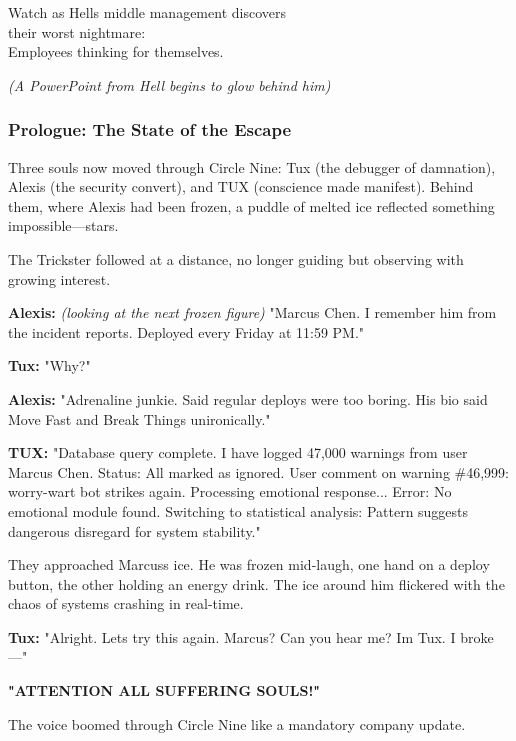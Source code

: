 Watch as Hell\textquotesingle s middle management discovers\\
their worst nightmare:\\
Employees thinking for themselves.

\emph{(A PowerPoint from Hell begins to glow behind him)}

\bookdivider

\subsubsection{Prologue: The State of the Escape}\label{prologue-the-state-of-the-escape}

Three souls now moved through Circle Nine: Tux (the debugger of damnation), Alexis (the security convert), and TUX (conscience made manifest). Behind them, where Alexis had been frozen, a puddle of melted ice reflected something impossible---stars.

The Trickster followed at a distance, no longer guiding but observing with growing interest.

\textbf{Alexis:} \emph{(looking at the next frozen figure)} "Marcus Chen. I remember him from the incident reports. Deployed every Friday at 11:59 PM."

\textbf{Tux:} "Why?"

\textbf{Alexis:} "Adrenaline junkie. Said regular deploys were \textquotesingle too boring.\textquotesingle{} His bio said \textquotesingle Move Fast and Break Things\textquotesingle{} unironically."

\textbf{TUX:} "Database query complete. I have logged 47,000 warnings from user Marcus Chen. Status: All marked as \textquotesingle ignored.\textquotesingle{} User comment on warning \#46,999: \textquotesingle worry-wart bot strikes again.\textquotesingle{} Processing emotional response... Error: No emotional module found. Switching to statistical analysis: Pattern suggests dangerous disregard for system stability."

They approached Marcus\textquotesingle s ice. He was frozen mid-laugh, one hand on a deploy button, the other holding an energy drink. The ice around him flickered with the chaos of systems crashing in real-time.

\textbf{Tux:} "Alright. Let\textquotesingle s try this again. Marcus? Can you hear me? I\textquotesingle m Tux. I broke---"

\textbf{"ATTENTION ALL SUFFERING SOULS!"}

The voice boomed through Circle Nine like a mandatory company update.


